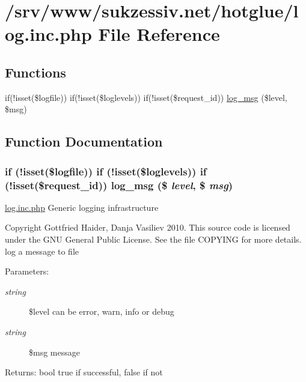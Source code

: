 \hypertarget{log_8inc_8php}{
\section{/srv/www/sukzessiv.net/hotglue/log.inc.php File Reference}
\label{log_8inc_8php}
}
\subsection*{Functions}
\begin{CompactItemize}
\item 
if(!isset(\$logfile)) if(!isset(\$loglevels)) if(!isset(\$request\_\-id)) \hyperlink{log_8inc_8php_0d59d693ca96c65b67de4b197954ce60}{log\_\-msg} (\$level, \$msg)
\end{CompactItemize}


\subsection{Function Documentation}
\hypertarget{log_8inc_8php_0d59d693ca96c65b67de4b197954ce60}{
\subsubsection[{log\_\-msg}]{\setlength{\rightskip}{0pt plus 5cm}if (!isset(\$logfile)) if (!isset(\$loglevels)) if (!isset(\$request\_\-id)) log\_\-msg (\$ {\em level}, \/  \$ {\em msg})}}
\label{log_8inc_8php_0d59d693ca96c65b67de4b197954ce60}


\hyperlink{log_8inc_8php}{log.inc.php} Generic logging infrastructure

Copyright Gottfried Haider, Danja Vasiliev 2010. This source code is licensed under the GNU General Public License. See the file COPYING for more details. log a message to file

\begin{Desc}
\item[Parameters:]
\begin{description}
\item[{\em string}]\$level can be error, warn, info or debug \item[{\em string}]\$msg message \end{description}
\end{Desc}
\begin{Desc}
\item[Returns:]bool true if successful, false if not \end{Desc}
